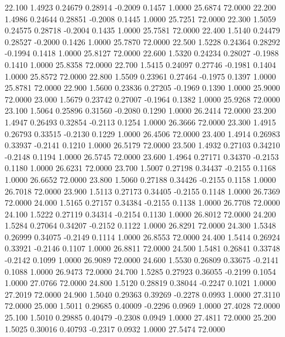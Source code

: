   22.100   1.4923   0.24679   0.28914  -0.2009   0.1457   1.0000  25.6874  72.0000
  22.200   1.4986   0.24644   0.28851  -0.2008   0.1445   1.0000  25.7251  72.0000
  22.300   1.5059   0.24575   0.28718  -0.2004   0.1435   1.0000  25.7581  72.0000
  22.400   1.5140   0.24479   0.28527  -0.2000   0.1426   1.0000  25.7870  72.0000
  22.500   1.5228   0.24364   0.28292  -0.1994   0.1418   1.0000  25.8127  72.0000
  22.600   1.5320   0.24234   0.28027  -0.1988   0.1410   1.0000  25.8358  72.0000
  22.700   1.5415   0.24097   0.27746  -0.1981   0.1404   1.0000  25.8572  72.0000
  22.800   1.5509   0.23961   0.27464  -0.1975   0.1397   1.0000  25.8781  72.0000
  22.900   1.5600   0.23836   0.27205  -0.1969   0.1390   1.0000  25.9000  72.0000
  23.000   1.5679   0.23742   0.27007  -0.1964   0.1382   1.0000  25.9268  72.0000
  23.100   1.5064   0.25896   0.31560  -0.2080   0.1290   1.0000  26.2414  72.0000
  23.200   1.4947   0.26493   0.32854  -0.2113   0.1254   1.0000  26.3666  72.0000
  23.300   1.4915   0.26793   0.33515  -0.2130   0.1229   1.0000  26.4506  72.0000
  23.400   1.4914   0.26983   0.33937  -0.2141   0.1210   1.0000  26.5179  72.0000
  23.500   1.4932   0.27103   0.34210  -0.2148   0.1194   1.0000  26.5745  72.0000
  23.600   1.4964   0.27171   0.34370  -0.2153   0.1180   1.0000  26.6231  72.0000
  23.700   1.5007   0.27198   0.34437  -0.2155   0.1168   1.0000  26.6652  72.0000
  23.800   1.5060   0.27188   0.34426  -0.2155   0.1158   1.0000  26.7018  72.0000
  23.900   1.5113   0.27173   0.34405  -0.2155   0.1148   1.0000  26.7369  72.0000
  24.000   1.5165   0.27157   0.34384  -0.2155   0.1138   1.0000  26.7708  72.0000
  24.100   1.5222   0.27119   0.34314  -0.2154   0.1130   1.0000  26.8012  72.0000
  24.200   1.5284   0.27064   0.34207  -0.2152   0.1122   1.0000  26.8291  72.0000
  24.300   1.5348   0.26999   0.34075  -0.2149   0.1114   1.0000  26.8553  72.0000
  24.400   1.5414   0.26924   0.33921  -0.2146   0.1107   1.0000  26.8811  72.0000
  24.500   1.5481   0.26841   0.33748  -0.2142   0.1099   1.0000  26.9089  72.0000
  24.600   1.5530   0.26809   0.33675  -0.2141   0.1088   1.0000  26.9473  72.0000
  24.700   1.5285   0.27923   0.36055  -0.2199   0.1054   1.0000  27.0766  72.0000
  24.800   1.5120   0.28819   0.38044  -0.2247   0.1021   1.0000  27.2019  72.0000
  24.900   1.5040   0.29363   0.39269  -0.2278   0.0993   1.0000  27.3110  72.0000
  25.000   1.5011   0.29685   0.40009  -0.2296   0.0969   1.0000  27.4028  72.0000
  25.100   1.5010   0.29885   0.40479  -0.2308   0.0949   1.0000  27.4811  72.0000
  25.200   1.5025   0.30016   0.40793  -0.2317   0.0932   1.0000  27.5474  72.0000
